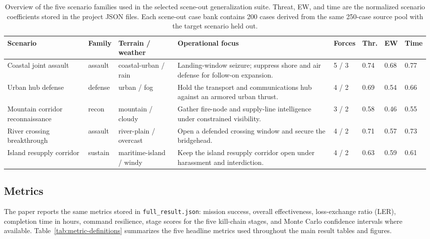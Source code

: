 \begin{table}[!t]
\centering
\caption{Overview of the five scenario families used in the selected scene-out generalization suite. Threat, EW, and time are the normalized scenario coefficients stored in the project JSON files. Each scene-out case bank contains 200 cases derived from the same 250-case source pool with the target scenario held out.}
\label{tab:scenario-overview}
{\scriptsize
\setlength{\tabcolsep}{2.6pt}
\renewcommand{\arraystretch}{1.05}
\begin{tabularx}{\textwidth}{P{2.15cm}P{1.00cm}P{1.85cm}Y C{0.85cm}C{0.78cm}C{0.72cm}C{0.72cm}}
\toprule
Scenario & Family & Terrain / weather & Operational focus & Forces & Thr. & EW & Time \\
\midrule
Coastal joint assault & assault & coastal-urban / rain & Landing-window seizure; suppress shore and air defense for follow-on expansion. & 5 / 3 & 0.74 & 0.68 & 0.77 \\
Urban hub defense & defense & urban / fog & Hold the transport and communications hub against an armored urban thrust. & 4 / 2 & 0.69 & 0.54 & 0.66 \\
Mountain corridor reconnaissance & recon & mountain / cloudy & Gather fire-node and supply-line intelligence under constrained visibility. & 3 / 2 & 0.58 & 0.46 & 0.55 \\
River crossing breakthrough & assault & river-plain / overcast & Open a defended crossing window and secure the bridgehead. & 4 / 2 & 0.71 & 0.57 & 0.73 \\
Island resupply corridor & sustain & maritime-island / windy & Keep the island resupply corridor open under harassment and interdiction. & 4 / 2 & 0.63 & 0.59 & 0.61 \\
\bottomrule
\end{tabularx}
\par}
\end{table}

\subsection{Metrics}

The paper reports the same metrics stored in \texttt{full\_result.json}: mission success, overall effectiveness, loss-exchange ratio (LER), completion time in hours, command resilience, stage scores for the five kill-chain stages, and Monte Carlo confidence intervals where available. Table~\ref{tab:metric-definitions} summarizes the five headline metrics used throughout the main result tables and figures.

